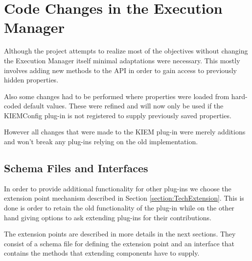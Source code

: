 \chapter{Code Changes in the Execution Manager}
\label{chapter:KiemChanges}
Although the project attempts to realize most of the objectives without
changing the Execution Manager itself minimal adaptations were necessary.
This mostly involves adding new methods to the \ac{API} in order to
gain access to previously hidden properties.

Also some changes had to be performed where properties were loaded from hard-coded 
default values. These were refined and will now only be used if the \ac{KIEMConfig} 
plug-in is not registered to supply previously saved properties.

However all changes that were made to the \ac{KIEM} plug-in were merely additions
and won't break any plug-ins relying on the old implementation.

\section{Schema Files and Interfaces}
In order to provide additional functionality for other plug-ins we choose the extension
point mechanism described in Section \ref{section:TechExtension}. This is done
is order to retain the old functionality of the plug-in while on the other hand giving
options to ask extending plug-ins for their contributions. 

The extension points are described in more details in the next sections. They consist
of a schema file for defining the extension point and an interface that contains the 
methods that extending components have to supply.

